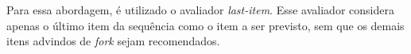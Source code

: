 Para essa abordagem, é utilizado o avaliador \textit{last-item}. Esse avaliador
considera apenas o último item da sequência como o item a ser previsto, sem que
os demais itens advindos de \textit{fork} sejam recomendados.



